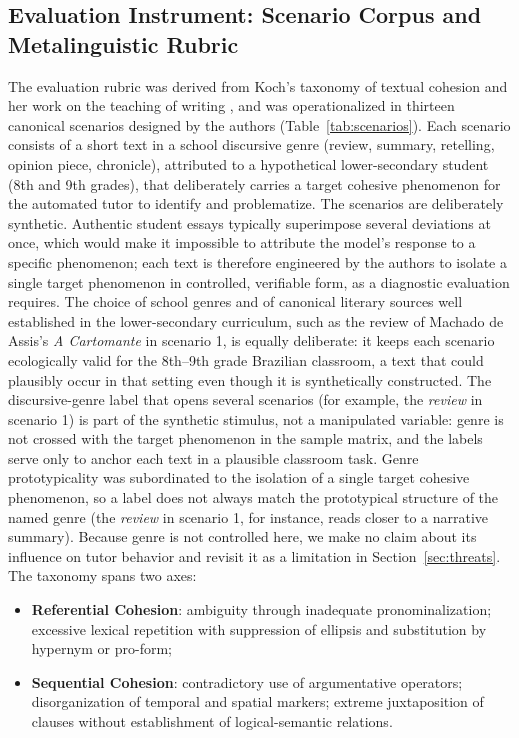 \documentclass{sbc2023}%
\begin{document}
\subsection{Evaluation Instrument: Scenario Corpus and Metalinguistic Rubric}
\label{sec:instrument}

The evaluation rubric was derived from Koch's taxonomy of textual cohesion \citep{koch2018coesao,koch2020introducao} and her work on the teaching of writing \citep{kochelias2016escrever}, and was operationalized in thirteen canonical scenarios designed by the authors (Table~\ref{tab:scenarios}). Each scenario consists of a short text in a school discursive genre (review, summary, retelling, opinion piece, chronicle), attributed to a hypothetical lower-secondary student (8th and 9th grades), that deliberately carries a target cohesive phenomenon for the automated tutor to identify and problematize. The scenarios are deliberately synthetic. Authentic student essays typically superimpose several deviations at once, which would make it impossible to attribute the model's response to a specific phenomenon; each text is therefore engineered by the authors to isolate a single target phenomenon in controlled, verifiable form, as a diagnostic evaluation requires. The choice of school genres and of canonical literary sources well established in the lower-secondary curriculum, such as the review of Machado de Assis's \textit{A Cartomante} in scenario 1, is equally deliberate: it keeps each scenario ecologically valid for the 8th--9th grade Brazilian classroom, a text that could plausibly occur in that setting even though it is synthetically constructed. The discursive-genre label that opens several scenarios (for example, the \textit{review} in scenario 1) is part of the synthetic stimulus, not a manipulated variable: genre is not crossed with the target phenomenon in the sample matrix, and the labels serve only to anchor each text in a plausible classroom task. Genre prototypicality was subordinated to the isolation of a single target cohesive phenomenon, so a label does not always match the prototypical structure of the named genre (the \textit{review} in scenario 1, for instance, reads closer to a narrative summary). Because genre is not controlled here, we make no claim about its influence on tutor behavior and revisit it as a limitation in Section~\ref{sec:threats}. The taxonomy spans two axes:

\begin{itemize}
\item \textbf{Referential Cohesion}: ambiguity through inadequate pronominalization; excessive lexical repetition with suppression of ellipsis and substitution by hypernym or pro-form;
\item \textbf{Sequential Cohesion}: contradictory use of argumentative operators; disorganization of temporal and spatial markers; extreme juxtaposition of clauses without establishment of logical-semantic relations.
\end{itemize}
\end{document}
